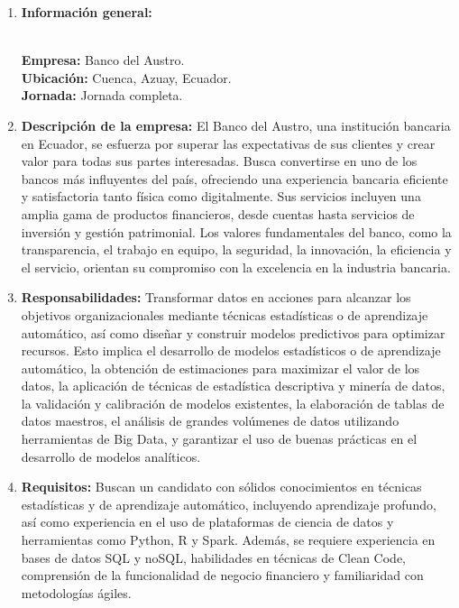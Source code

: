 \documentclass[12pt]{article}
\begin{document}
                \begin{enumerate}
                    \item \textbf{Información general:}
                    
                        \textbf{\\Empresa:} Banco del Austro.
                        \textbf{\\Ubicación:} Cuenca, Azuay, Ecuador.
                        \textbf{\\Jornada:} Jornada completa.

                    \item \textbf{Descripción de la empresa:}
                        El Banco del Austro, una institución bancaria en Ecuador, se esfuerza por superar las expectativas de sus clientes y crear valor para todas sus partes interesadas. Busca convertirse en uno de los bancos más influyentes del país, ofreciendo una experiencia bancaria eficiente y satisfactoria tanto física como digitalmente. Sus servicios incluyen una amplia gama de productos financieros, desde cuentas hasta servicios de inversión y gestión patrimonial. Los valores fundamentales del banco, como la transparencia, el trabajo en equipo, la seguridad, la innovación, la eficiencia y el servicio, orientan su compromiso con la excelencia en la industria bancaria.

                    \item \textbf{Responsabilidades:}
                        Transformar datos en acciones para alcanzar los objetivos organizacionales mediante técnicas estadísticas o de aprendizaje automático, así como diseñar y construir modelos predictivos para optimizar recursos. Esto implica el desarrollo de modelos estadísticos o de aprendizaje automático, la obtención de estimaciones para maximizar el valor de los datos, la aplicación de técnicas de estadística descriptiva y minería de datos, la validación y calibración de modelos existentes, la elaboración de tablas de datos maestros, el análisis de grandes volúmenes de datos utilizando herramientas de Big Data, y garantizar el uso de buenas prácticas en el desarrollo de modelos analíticos.

                    \item \textbf{Requisitos:}
                        Buscan un candidato con sólidos conocimientos en técnicas estadísticas y de aprendizaje automático, incluyendo aprendizaje profundo, así como experiencia en el uso de plataformas de ciencia de datos y herramientas como Python, R y Spark. Además, se requiere experiencia en bases de datos SQL y noSQL, habilidades en técnicas de Clean Code, comprensión de la funcionalidad de negocio financiero y familiaridad con metodologías ágiles.


\end{enumerate}
\end{document}
